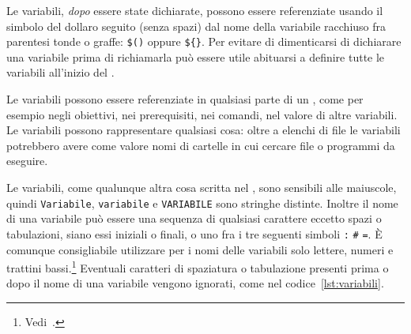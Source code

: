 Le variabili, \emph{dopo} essere state dichiarate, possono essere referenziate
usando il simbolo del dollaro seguito (senza spazi) dal nome della variabile
racchiuso fra parentesi tonde o graffe:
\texttt{\$(}\texttt{)} oppure
\texttt{\$\{}\texttt{\}}.  Per evitare di
dimenticarsi di dichiarare una variabile prima di richiamarla può essere utile
abituarsi a definire tutte le variabili all'inizio del .

Le variabili possono essere referenziate in qualsiasi parte di un
, come per esempio negli obiettivi, nei prerequisiti, nei
comandi, nel valore di altre variabili.  Le variabili possono rappresentare
qualsiasi cosa: oltre a elenchi di file le variabili potrebbero avere come
valore nomi di cartelle in cui cercare file o programmi da eseguire.

Le variabili, come qualunque altra cosa scritta nel , sono
sensibili alle maiuscole, quindi \texttt{Variabile}, \texttt{variabile} e
\texttt{VARIABILE} sono stringhe distinte.  Inoltre il nome di una variabile può
essere una sequenza di qualsiasi carattere eccetto spazi o tabulazioni, siano
essi iniziali o finali, o uno fra i tre seguenti simboli \texttt{:} \texttt{\#}
\texttt{=}.  È comunque consigliabile utilizzare per i nomi delle variabili solo
lettere, numeri e trattini bassi.\footnote{Vedi~\cite[pagina 57]{gnu:make}.}
Eventuali caratteri di spaziatura o tabulazione presenti prima o dopo il nome di
una variabile vengono ignorati, come nel codice~\ref{lst:variabili}.

